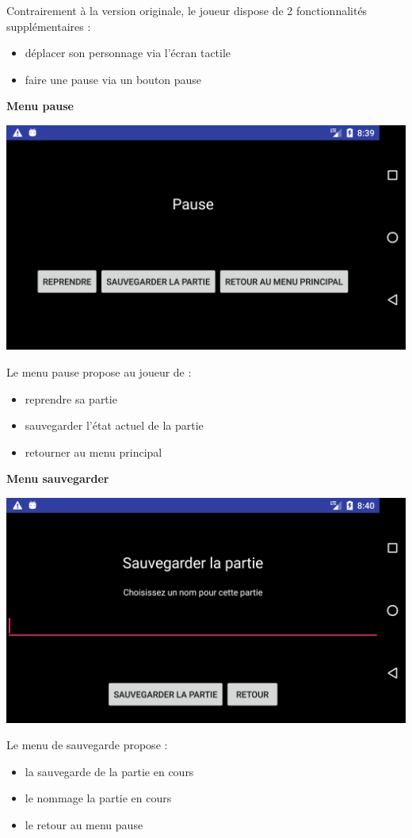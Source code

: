 \documentclass{article}
\begin{document}
Contrairement à la version originale, le joueur dispose de 2 fonctionnalités supplémentaires :
\begin{itemize}
\item déplacer son personnage via l'écran tactile
\item faire une pause via un bouton pause
\end{itemize}

\bigskip

\textbf{Menu pause}
\begin{center}
  \includegraphics[scale=0.25]{PauseActivity.png}
\end{center}
Le menu pause propose au joueur de :
\begin{itemize}
\item reprendre sa partie
\item sauvegarder l’état actuel de la partie
\item retourner au menu principal
\end{itemize}

\bigskip

\textbf{Menu sauvegarder}
\begin{center}
  \includegraphics[scale=0.25]{SaveActivity.png}
\end{center}
Le menu de sauvegarde propose :
\begin{itemize}
\item la sauvegarde de la partie en cours
\item le nommage la partie en cours
\item le retour au menu pause
\end{itemize}
\end{document}
